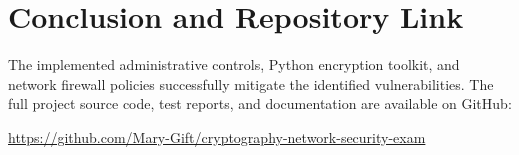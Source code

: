 \documentclass[12pt,a4paper]{article}
\begin{document}
\section{Conclusion and Repository Link}
The implemented administrative controls, Python encryption toolkit, and network firewall policies successfully mitigate the identified vulnerabilities. The full project source code, test reports, and documentation are available on GitHub:
\begin{center}
\url{https://github.com/Mary-Gift/cryptography-network-security-exam}
\end{center}
\end{document}
